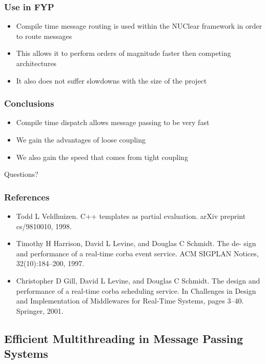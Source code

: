 \documentclass{beamer}
\begin{document}
	\begin{frame}
		\frametitle{Use in FYP}
		\begin{itemize}
			\item Compile time message routing is used within the NUClear framework in order to route messages
			\item This allows it to perform orders of magnitude faster then competing architectures
			\item It also does not suffer slowdowns with the size of the project
		\end{itemize}
	\end{frame}

	\begin{frame}
		\frametitle{Conclusions}
		\begin{itemize}
			\item Compile time dispatch allows message passing to be very fast
			\item We gain the advantages of loose coupling
			\item We also gain the speed that comes from tight coupling
		\end{itemize}
	\end{frame}

	\begin{frame}
		\huge Questions?
	\end{frame}

	\begin{frame}
		\frametitle{References}
		\begin{itemize}
			\item Todd L Veldhuizen. C++ templates as partial evaluation. arXiv preprint cs/9810010, 1998.	\item Timothy H Harrison, David L Levine, and Douglas C Schmidt. The de- sign and performance of a real-time corba event service. ACM SIGPLAN Notices, 32(10):184–200, 1997.
			\item Christopher D Gill, David L Levine, and Douglas C Schmidt. The design and performance of a real-time corba scheduling service. In Challenges in Design and Implementation of Middlewares for Real-Time Systems, pages 3–40. Springer, 2001.
		\end{itemize}
	\end{frame}

	\subsection{Efficient Multithreading in Message Passing Systems}
	\begin{frame}
		\subsectionpage
	\end{frame}
\end{document}
